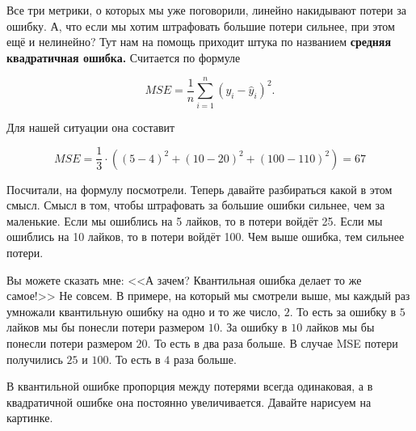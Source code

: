 \documentclass[12pt, a4paper, oneside]{article}
\theoremstyle{plain} %
\theoremstyle{definition}
\newcommand{\indef}[1]{\textbf{ \color{green} #1}}
\begin{document}
\begin{solution}
\begin{itemize}
Все три метрики, о которых мы уже поговорили, линейно накидывают потери за ошибку. А, что если мы хотим штрафовать большие потери сильнее, при этом ещё и нелинейно? Тут нам на помощь приходит штука по названием \indef{средняя квадратичная ошибка.} Считается по формуле 

$$ MSE = \frac{1}{n}\sum_{i=1}^{n} (y_i - \hat{y}_i)^2.$$

Для нашей ситуации она составит 

$$
MSE = \frac{1}{3} \cdot(  (5-4)^2 + (10 - 20)^2 + (100 - 110)^2) = 67
$$ 

Посчитали, на формулу посмотрели. Теперь давайте разбираться какой в этом смысл. Смысл в том, чтобы штрафовать за большие ошибки сильнее, чем за маленькие. Если мы ошиблись на 5 лайков, то в потери войдёт 25. Если мы ошиблись на 10 лайков, то в потери войдёт 100. Чем выше ошибка, тем сильнее потери. 

Вы можете сказать мне:  <<А зачем? Квантильная ошибка делает то же самое!>> Не совсем. В примере, на который мы смотрели выше, мы каждый раз умножали квантильную ошибку на одно и то же число, $2$. То есть за ошибку в $5$ лайков мы бы понесли потери размером $10$.  За ошибку в $10$ лайков мы бы понесли потери размером $20$. То есть в два раза больше. В случае MSE потери получились $25$ и $100$. То есть в $4$ раза больше. 

В квантильной ошибке пропорция между потерями всегда одинаковая, а в квадратичной ошибке она постоянно увеличивается.  Давайте нарисуем на картинке. 

\begin{center}
\end{center}
	

\end{itemize}
\end{solution}
\end{document}
